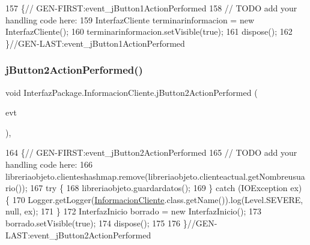 \begin{DoxyCode}
157                                                                          \{\textcolor{comment}{//
      GEN-FIRST:event\_jButton1ActionPerformed}
158         \textcolor{comment}{// TODO add your handling code here:}
159         InterfazCliente terminarinformacion = \textcolor{keyword}{new} InterfazCliente();
160         terminarinformacion.setVisible(\textcolor{keyword}{true});
161         dispose();
162     \}\textcolor{comment}{//GEN-LAST:event\_jButton1ActionPerformed}
\end{DoxyCode}
\mbox{\label{class_interfaz_package_1_1_informacion_cliente_abc5f4088b44b2ba167f13466732dec5c}} 
\subsubsection{\texorpdfstring{j\+Button2\+Action\+Performed()}{jButton2ActionPerformed()}}
{\footnotesize\ttfamily void Interfaz\+Package.\+Informacion\+Cliente.\+j\+Button2\+Action\+Performed (\begin{DoxyParamCaption}\item[{java.\+awt.\+event.\+Action\+Event}]{evt }\end{DoxyParamCaption})\hspace{0.3cm}{\ttfamily [inline]}, {\ttfamily [private]}}


\begin{DoxyCode}
164                                                                          \{\textcolor{comment}{//
      GEN-FIRST:event\_jButton2ActionPerformed}
165         \textcolor{comment}{// TODO add your handling code here:}
166         libreriaobjeto.clienteshashmap.remove(libreriaobjeto.clienteactual.getNombreusuario());
167         \textcolor{keywordflow}{try} \{
168             libreriaobjeto.guardardatos();
169         \} \textcolor{keywordflow}{catch} (IOException ex) \{
170             Logger.getLogger(\mbox{\hyperlink{class_interfaz_package_1_1_informacion_cliente_aad6339ab89c410c65ca97dc545479efb}{InformacionCliente}}.class.getName()).log(Level.SEVERE, null, 
      ex);
171         \}
172         InterfazInicio borrado = \textcolor{keyword}{new} InterfazInicio();
173         borrado.setVisible(\textcolor{keyword}{true});
174         dispose();
175         
176     \}\textcolor{comment}{//GEN-LAST:event\_jButton2ActionPerformed}
\end{DoxyCode}
\mbox{\label{class_interfaz_package_1_1_informacion_cliente_a05c700e1fdb8597cf418336d39b717e9}} 
